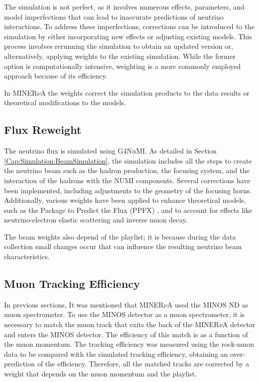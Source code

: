 The simulation is not perfect, as it involves numerous effects, parameters, and model imperfections that can lead to inaccurate predictions of neutrino interactions. To address these imperfections, corrections can be introduced to the simulation by either incorporating new effects or adjusting existing models. This process involves rerunning the simulation to obtain an updated version or, alternatively, applying weights to the existing simulation. While the former option is computationally intensive, weighting is a more commonly employed approach because of its efficiency.

In MINER$\nu$A the weights correct the simulation products to the data results or theoretical modifications to the models. 

\subsection{Flux Reweight}
\label{Cap:Simulation:MnvGENIETunes:Flux}
The neutrino flux is simulated using G4NuMI. As detailed in Section \ref{Cap:Simulation:BeamSimulation}, the simulation includes all the steps to create the neutrino beam such as the hadron production, the focusing system, and the interaction of the hadrons with the NUMI components. Several corrections have been implemented, including adjustments to the geometry of the focusing horns. Additionally, various weights have been applied to enhance theoretical models, such as the Package to Predict the Flux (PPFX) \cite{LeoThesis}, and to account for effects like neutrino-electron elastic scattering and inverse muon decay.

The beam weights also depend of the playlist; it is because during the data collection small changes occur that can influence the resulting neutrino beam characteristics. 

\subsection{Muon Tracking Efficiency}
\label{Cap:Simulation:MnvGENIETunes:MinosEff}
In previous sections, It was mentioned that MINER$\nu$A used the MINOS ND as muon spectrometer. To use the MINOS detector as a muon spectrometer, it is necessary to match the muon track that exits the back of the MINER$\nu$A detector and enters the MINOS detector. The efficiency of this match is as a function of the muon momentum. The tracking efficiency was measured using the rock-muon data to be compared with the simulated tracking efficiency, obtaining an over-prediction of the efficiency. Therefore, all the matched tracks are corrected by a weight that depends on the muon momentum and the playlist. 

